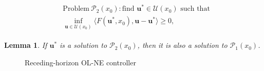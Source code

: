 \documentclass[letterpaper, 10 pt, conference]{ieeeconf}  %
\newcommand{\mc}{\mathcal}
\newcommand{\bu}{\boldsymbol{u}}
\newtheorem{lemma}[theorem]{Lemma}
\begin{document}
\begin{align}
\begin{split}
    &\text{Problem}~ \mc P_2(x_0): \text{find $\bu^*\in \mc U(x_0) $ such that} \\
    &\inf\limits_{\bu\in \mc U(x_0)}\langle F(\bu^*, x_0), \bu - \bu^* \rangle \geq 0,
\end{split}
\end{align}

\begin{lemma}\cite[Proposition 1?]{benenati2024linear}\label{lem: OL-NE as VI}
    If $\bu^*$ is a solution to $\mc P_2(x_0)$, then it is also a solution to  $\mc P_1(x_0)$.
\end{lemma}

\begin{figure}
    \centering
    \centering\resizebox{.7\columnwidth}{!}{}
    \caption{Receding-horizon OL-NE controller}
    \label{fig:block_scheme}
\end{figure}
\end{document}
